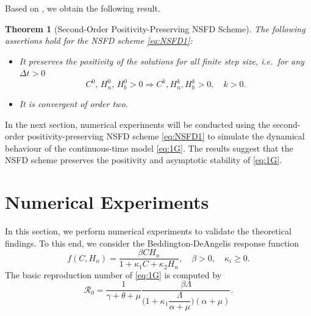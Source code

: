 \documentclass[11pt]{article}
\newtheorem{theorem}{Theorem}[section]
\theoremstyle{definition}
\theoremstyle{remark}
\newtheorem{remark}[theorem]{Remark}
\numberwithin{equation}{section}
\begin{document}
Based on \cite[Theorems 1 and 2]{HoangMatthias2026}, we obtain the following result.
\begin{theorem}[Second-Order Positivity-Preserving NSFD Scheme]\label{TheoremNSFD}
The following assertions hold for the NSFD scheme \eqref{eq:NSFD1}:
\begin{itemize}
\item[(i)] It preserves the positivity of the solutions for all finite step size, i.e.\ for any $\Delta t > 0$
\begin{equation*}
C^0,\, H_n^0,\, H_b^0 > 0 \Longrightarrow C^k, H_n^k, H_b^k > 0, \quad k > 0.
\end{equation*}
\item[(ii)] It is convergent of order two.
\end{itemize}
\end{theorem}
In  the next section, numerical experiments will be conducted using the second-order positivity-preserving NSFD scheme \eqref{eq:NSFD1} to simulate the dynamical behaviour of the continuous-time model \eqref{eq:1G}.
The results suggest that the NSFD scheme preserves the positivity and asymptotic stability of \eqref{eq:1G}.



\section{Numerical Experiments}\label{Sec4}
In this section, we perform numerical experiments to validate  the theoretical findings. To this end, we consider the Beddington-DeAngelis response function \cite{Beddington, DeAngelis}
\begin{equation}\label{eq:Nonlinear}
   f(C, H_n) = \dfrac{\beta CH_n}{1 + \kappa_1 C + \kappa_2 H_n}, \quad \beta > 0, \quad \kappa_i \ge0.
\end{equation}
The basic reproduction number of \eqref{eq:1G} is computed by
\begin{equation*}
\mathcal{R}_0 = \dfrac{1}{\gamma + \theta + \mu}\dfrac{\beta\Lambda}{\bigg(1 + \kappa_1\dfrac{\Lambda}{\alpha + \mu}\bigg)(\alpha + \mu)}.
\end{equation*}

\end{document}
